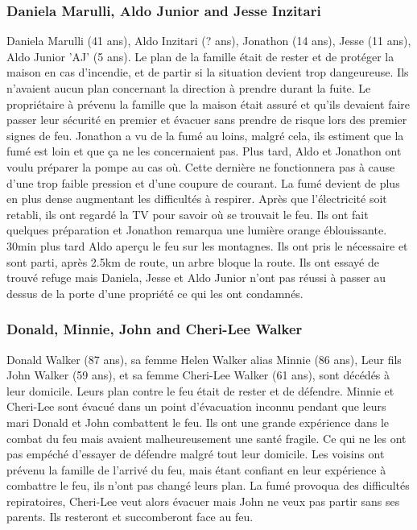             \subsubsection{Daniela Marulli, Aldo Junior and Jesse Inzitari}
                Daniela Marulli (41 ans),
                Aldo Inzitari (? ans),
                Jonathon (14 ans),
                Jesse (11 ans),
                Aldo Junior 'AJ' (5 ans).
                Le plan de la famille était de rester et de protéger la maison en cas d'incendie, et de partir si la situation devient trop
                dangeureuse. Ils n'avaient aucun plan concernant la direction à prendre durant la fuite. Le propriétaire à prévenu la famille
                que la maison était assuré et qu'ils devaient faire passer leur sécurité en premier et évacuer sans prendre de risque lors des
                premier signes de feu.
                Jonathon a vu de la fumé au loins, malgré cela, ils estiment que la fumé est loin et que ça ne les concernaient pas.
                Plus tard, Aldo et Jonathon ont voulu préparer la pompe au cas où. Cette dernière ne fonctionnera pas à cause d'une trop faible
                pression et d'une coupure de courant. La fumé devient de plus en plus dense augmentant les difficultés à respirer. Après que
                l'électricité soit retabli, ils ont regardé la TV pour savoir où se trouvait le feu. Ils ont fait quelques préparation et
                Jonathon remarqua une lumière orange éblouissante. 30min plus tard Aldo aperçu le feu sur les montagnes.
                Ils ont pris le nécessaire et sont parti, après 2.5km de route, un arbre bloque la route.
                Ils ont essayé de trouvé refuge mais Daniela, Jesse et Aldo Junior n'ont pas réussi à passer au dessus de la porte d'une
                propriété ce qui les ont condamnés.

            \subsubsection{Donald, Minnie, John and Cheri-Lee Walker}
                Donald Walker (87 ans),
                sa femme Helen Walker alias Minnie (86 ans),
                Leur fils John Walker (59 ans),
                et sa femme Cheri-Lee Walker (61 ans),
                sont décédés à leur domicile.
                Leurs plan contre le feu était de rester et de défendre. Minnie et Cheri-Lee sont évacué dans un point d'évacuation inconnu
                pendant que leurs mari Donald et John combattent le feu. Ils ont une grande expérience dans le combat du feu mais avaient
                malheureusement une santé fragile. Ce qui ne les ont pas empéché d'essayer de défendre malgré tout leur domicile. Les voisins
                ont prévenu la famille de l'arrivé du feu, mais étant confiant en leur expérience à combattre le feu, ils n'ont pas changé leurs
                plan. La fumé provoqua des difficultés repiratoires, Cheri-Lee veut alors évacuer mais John ne veux pas partir sans ses parents.
                Ils resteront et succomberont face au feu.

